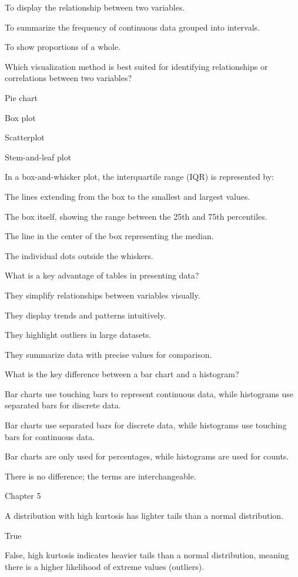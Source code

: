 \documentclass[
  letterpaper,
  DIV=11,
  numbers=noendperiod]{scrreprt}
\begin{document}
To display the relationship between two variables.

To summarize the frequency of continuous data grouped into intervals.

To show proportions of a whole.

Which visualization method is best suited for identifying relationships
or correlations between two variables?

Pie chart

Box plot

Scatterplot

Stem-and-leaf plot

In a box-and-whisker plot, the interquartile range (IQR) is represented
by:

The lines extending from the box to the smallest and largest values.

The box itself, showing the range between the 25th and 75th percentiles.

The line in the center of the box representing the median.

The individual dots outside the whiskers.

What is a key advantage of tables in presenting data?

They simplify relationships between variables visually.

They display trends and patterns intuitively.

They highlight outliers in large datasets.

They summarize data with precise values for comparison.

What is the key difference between a bar chart and a histogram?

Bar charts use touching bars to represent continuous data, while
histograms use separated bars for discrete data.

Bar charts use separated bars for discrete data, while histograms use
touching bars for continuous data.

Bar charts are only used for percentages, while histograms are used for
counts.

There is no difference; the terms are interchangeable.

Chapter 5

A distribution with high kurtosis has lighter tails than a normal
distribution.

True

False, high kurtosis indicates heavier tails than a normal distribution,
meaning there is a higher likelihood of extreme values (outliers).
\end{document}
